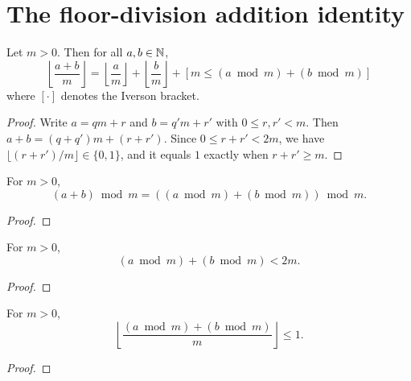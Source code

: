 
\section{The floor-division addition identity}

\begin{lemma}
  \label{lem:divn_add}
  \rocqok
  Let $m > 0$. Then for all $a, b \in \mathbb{N}$,
  \[
    \left\lfloor \frac{a+b}{m} \right\rfloor
    = \left\lfloor \frac{a}{m} \right\rfloor
    + \left\lfloor \frac{b}{m} \right\rfloor
    + [m \leq (a \bmod m) + (b \bmod m)]
  \]
  where $[\cdot]$ denotes the Iverson bracket.
  \begin{proof}
    \rocqok
    Write $a = qm + r$ and $b = q'm + r'$ with $0 \leq r, r' < m$.
    Then $a + b = (q + q')m + (r + r')$. Since $0 \leq r + r' < 2m$,
    we have $\lfloor(r+r')/m\rfloor \in \{0, 1\}$, and it equals $1$
    exactly when $r + r' \geq m$.
  \end{proof}
\end{lemma}

\begin{lemma}
  \label{lem:modn_add}
  \rocqok
  For $m > 0$,
  \[
    (a + b) \bmod m = ((a \bmod m) + (b \bmod m)) \bmod m.
  \]
  \begin{proof}
    \rocqok
  \end{proof}
\end{lemma}

\begin{lemma}
  \label{lem:divn_add_mod_bound}
  \rocqok
  For $m > 0$,
  \[
    (a \bmod m) + (b \bmod m) < 2m.
  \]
  \begin{proof}
    \rocqok
  \end{proof}
\end{lemma}

\begin{lemma}
  \label{lem:divn_add_mod_cases}
  \rocqok
  For $m > 0$,
  \[
    \left\lfloor \frac{(a \bmod m) + (b \bmod m)}{m} \right\rfloor \leq 1.
  \]
  \begin{proof}
    \rocqok
  \end{proof}
\end{lemma}

